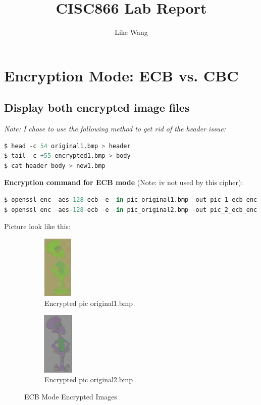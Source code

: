 \documentclass{article}
\title{CISC866 Lab Report}
\author{Like Wang}
\begin{document}
\maketitle

\section{Encryption Mode: ECB vs. CBC}

\subsection{Display both encrypted image files}

\textit{Note: I chose to use the following method to get rid of the header issue:}
\begin{lstlisting}[language=Python]
$ head -c 54 original1.bmp > header
$ tail -c +55 encrypted1.bmp > body
$ cat header body > new1.bmp
\end{lstlisting}
\textbf{Encryption command for ECB mode} (Note: iv not used by this cipher):
\begin{lstlisting}[language=Python]
$ openssl enc -aes-128-ecb -e -in pic_original1.bmp -out pic_1_ecb_enc.bmp -K 00112233445566778889aabbccddeeff
$ openssl enc -aes-128-ecb -e -in pic_original2.bmp -out pic_2_ecb_enc.bmp -K 00112233445566778889aabbccddeeff
\end{lstlisting}
Picture look like this:
\begin{figure}[h]
    \centering
    \begin{subfigure}{0.45\textwidth}
        \centering
        \includegraphics[height=3cm]{images/pic_1_ecb.png}
        \caption{Encrypted pic original1.bmp}
    \end{subfigure}
    \begin{subfigure}{0.45\textwidth}
        \centering
        \includegraphics[height=3cm]{images/pic_2_ecb.png}
        \caption{Encrypted pic original2.bmp}
    \end{subfigure}
    \caption{ECB Mode Encrypted Images}
\end{figure}
\end{document}
